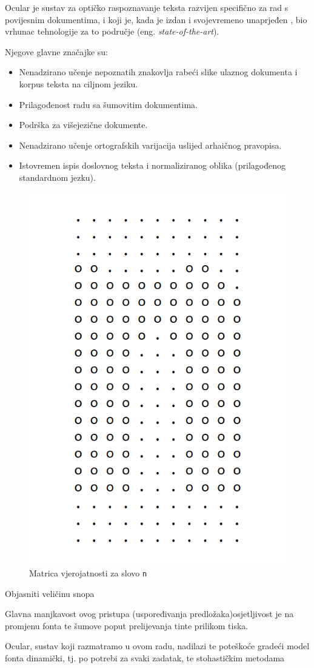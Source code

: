\documentclass[zavrsnirad]{fer}
\begin{document}
Ocular \cite{Berg2013} je sustav za optičko raspoznavanje teksta razvijen specifično za rad s povijesnim dokumentima, i koji je, kada je izdan i svojevremeno unaprjeđen \cite{Berg2014}, bio vrhunac tehnologije za to područje (eng. \textit{state-of-the-art}).

Njegove glavne značajke su: \cite{Ocular}

\begin{itemize}
	\item Nenadzirano učenje nepoznatih znakovlja rabeći slike ulaznog dokumenta i korpus teksta na ciljnom jeziku.
	\item Prilagođenost radu sa šumovitim dokumentima.
	\item Podrška za višejezične dokumente.
	\item Nenadzirano učenje ortografskih varijacija uslijed arhaičnog pravopisa.
	\item Istovremen ispis doslovnog teksta i normaliziranog oblika (prilagođenog standardnom jezku).
\end{itemize}


\begin{figure}[hbt]
	\centering
	\includegraphics[width=0.35\linewidth]{Figures/letter-matrix.png} 
	\caption{Matrica vjerojatnosti za slovo \texttt{n}}
	\label{slk:matrica}
\end{figure}



Objasniti veličinu snopa


Glavna manjkavost ovog pristupa (uspoređivanja predložaka)osjetljivost je na promjenu fonta te šumove poput prelijevanja tinte prilikom tiska.

Ocular, sustav koji razmatramo u ovom radu, nadilazi te poteškoće gradeći model fonta dinamički, tj. po potrebi za svaki zadatak, te stohastičkim metodama

\end{document}
